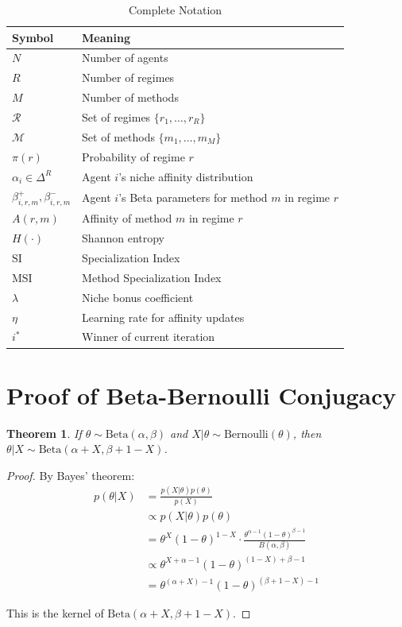 \documentclass[11pt,a4paper]{article}
\theoremstyle{definition}
\theoremstyle{plain}
\newtheorem{theorem}{Theorem}[section]
\newcommand{\SI}{\text{SI}}
\newcommand{\MSI}{\text{MSI}}
\begin{document}
\begin{table}[h]
\centering
\caption{Complete Notation}
\begin{tabular}{ll}
\toprule
Symbol & Meaning \\
\midrule
$N$ & Number of agents \\
$R$ & Number of regimes \\
$M$ & Number of methods \\
$\mathcal{R}$ & Set of regimes $\{r_1, \ldots, r_R\}$ \\
$\mathcal{M}$ & Set of methods $\{m_1, \ldots, m_M\}$ \\
$\pi(r)$ & Probability of regime $r$ \\
$\alpha_i \in \Delta^R$ & Agent $i$'s niche affinity distribution \\
$\beta_{i,r,m}^+, \beta_{i,r,m}^-$ & Agent $i$'s Beta parameters for method $m$ in regime $r$ \\
$A(r, m)$ & Affinity of method $m$ in regime $r$ \\
$H(\cdot)$ & Shannon entropy \\
$\SI$ & Specialization Index \\
$\MSI$ & Method Specialization Index \\
$\lambda$ & Niche bonus coefficient \\
$\eta$ & Learning rate for affinity updates \\
$i^*$ & Winner of current iteration \\
\bottomrule
\end{tabular}
\end{table}

\section{Proof of Beta-Bernoulli Conjugacy}

\begin{theorem}
If $\theta \sim \text{Beta}(\alpha, \beta)$ and $X | \theta \sim \text{Bernoulli}(\theta)$, then $\theta | X \sim \text{Beta}(\alpha + X, \beta + 1 - X)$.
\end{theorem}

\begin{proof}
By Bayes' theorem:
\begin{align}
p(\theta | X) &= \frac{p(X | \theta) p(\theta)}{p(X)} \\
&\propto p(X | \theta) p(\theta) \\
&= \theta^X (1-\theta)^{1-X} \cdot \frac{\theta^{\alpha-1}(1-\theta)^{\beta-1}}{B(\alpha, \beta)} \\
&\propto \theta^{X + \alpha - 1} (1-\theta)^{(1-X) + \beta - 1} \\
&= \theta^{(\alpha + X) - 1} (1-\theta)^{(\beta + 1 - X) - 1}
\end{align}

This is the kernel of $\text{Beta}(\alpha + X, \beta + 1 - X)$.
\end{proof}
\end{document}
